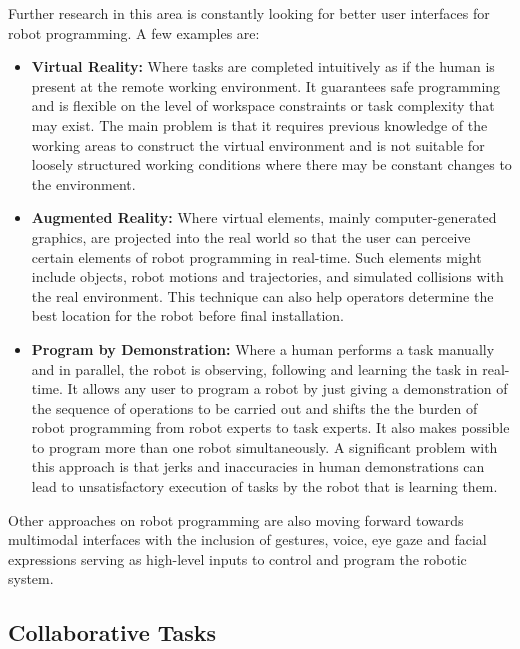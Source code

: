 \par Further research in this area is constantly looking for better user interfaces for robot programming. A few examples are:

\begin{itemize}
    \item \textbf{Virtual Reality: }Where tasks are completed intuitively as if the human is present at the remote working environment. It guarantees safe programming and is flexible on the level of workspace constraints or task complexity that may exist. The main problem is that it requires previous knowledge of the working areas to construct the virtual environment and is not suitable for loosely structured working conditions where there may be constant changes to the environment.
    \item \textbf{Augmented Reality: }Where virtual elements, mainly computer-generated graphics, are projected into the real world so that the user can perceive certain elements of robot programming in real-time. Such elements might include objects, robot motions and trajectories, and  simulated collisions with the real environment. This technique can also help operators determine the best location for the robot before final installation.
    \item \textbf{Program by Demonstration: }Where a human performs a task manually and in parallel, the robot is observing, following and learning the task in real-time. It allows any user to program a robot by just giving a demonstration of the sequence of operations to be carried out and shifts the the burden of robot programming from robot experts to task experts. It also makes possible to program more than one robot simultaneously. A significant problem with this approach is that jerks and inaccuracies in human demonstrations can lead to unsatisfactory execution of tasks by the robot that is learning them.
\end{itemize}


\par Other approaches on robot programming are also moving forward towards multimodal interfaces with the inclusion of gestures, voice, eye gaze and facial expressions serving as high-level inputs to control and program the robotic system.


\subsection{Collaborative Tasks}


